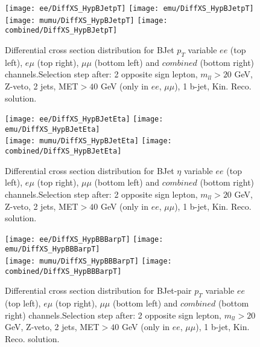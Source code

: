 \clearpage
\newpage


\begin{figure}
  \texttt{[image: ee/DiffXS\_HypBJetpT]}
  \texttt{[image: emu/DiffXS\_HypBJetpT]}\\
  \texttt{[image: mumu/DiffXS\_HypBJetpT]}
  \texttt{[image: combined/DiffXS\_HypBJetpT]}
\caption{Differential cross section distribution for  BJet $p_T$ variable  $ee$ (top left), $e\mu$ (top right), $\mu\mu$ (bottom left) and $combined$ (bottom right) channels.\newline Selection step after: 2 opposite sign lepton, $m_{ll}>20$ GeV, Z-veto, 2 jets, MET$>40$ GeV (only in $ee$, $\mu\mu$), 1 b-jet, Kin. Reco. solution.}
\end{figure}

\clearpage
\newpage

\begin{figure}
  \texttt{[image: ee/DiffXS\_HypBJetEta]}
  \texttt{[image: emu/DiffXS\_HypBJetEta]}\\
  \texttt{[image: mumu/DiffXS\_HypBJetEta]}
  \texttt{[image: combined/DiffXS\_HypBJetEta]}
\caption{Differential cross section distribution for  BJet $\eta$ variable  $ee$ (top left), $e\mu$ (top right), $\mu\mu$ (bottom left) and $combined$ (bottom right) channels.\newline Selection step after: 2 opposite sign lepton, $m_{ll}>20$ GeV, Z-veto, 2 jets, MET$>40$ GeV (only in $ee$, $\mu\mu$), 1 b-jet, Kin. Reco. solution.}
\end{figure}

\clearpage
\newpage




\begin{figure}
  \texttt{[image: ee/DiffXS\_HypBBBarpT]}
  \texttt{[image: emu/DiffXS\_HypBBBarpT]}\\
  \texttt{[image: mumu/DiffXS\_HypBBBarpT]}
  \texttt{[image: combined/DiffXS\_HypBBBarpT]}
\caption{Differential cross section distribution for  BJet-pair $p_T$ variable  $ee$ (top left), $e\mu$ (top right), $\mu\mu$ (bottom left) and $combined$ (bottom right) channels.\newline Selection step after: 2 opposite sign lepton, $m_{ll}>20$ GeV, Z-veto, 2 jets, MET$>40$ GeV (only in $ee$, $\mu\mu$), 1 b-jet, Kin. Reco. solution.}
\end{figure}

